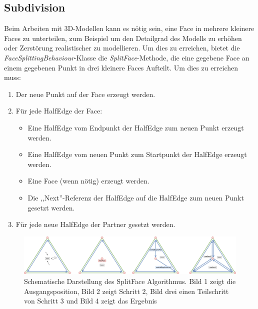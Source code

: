 \subsection{Subdivision}
Beim Arbeiten mit 3D-Modellen kann es n\"otig sein, eine Face in mehrere kleinere Faces zu unterteilen, zum Beispiel um den Detailgrad des Modells zu erh\"ohen oder Zerst\"orung realistischer zu modellieren. Um dies zu erreichen, bietet die \textit{FaceSplittingBehaviour}-Klasse die \textit{SplitFace}-Methode, die eine gegebene Face an einem gegebenen Punkt in drei kleinere Faces Aufteilt. Um dies zu erreichen muss:
\begin{enumerate}
	\item Der neue Punkt auf der Face erzeugt werden.
	\item F\"ur jede HalfEdge der Face:
	\begin{itemize}
		\item Eine HalfEdge vom Endpunkt der HalfEdge zum neuen Punkt erzeugt werden.
		\item Eine HalfEdge vom neuen Punkt zum Startpunkt der HalfEdge erzeugt werden.
		\item Eine Face (wenn n\"otig) erzeugt werden.
		\item Die ,,Next''-Referenz der HalfEdge auf die HalfEdge zum neuen Punkt gesetzt werden.
	\end{itemize}
	\item F\"ur jede neue HalfEdge der Partner gesetzt werden.
\end{enumerate}
\begin{figure}[H]
	\centering
	\includegraphics[width=1\linewidth]{Images/splitFace}
	\caption{Schematische Darstellung des SplitFace Algorithmus. Bild 1 zeigt die Ausgangsposition, Bild 2 zeigt Schritt 2, Bild drei einen Teilschritt von Schritt 3 und Bild 4 zeigt das Ergebnis}
	\label{fig:splitface}
\end{figure}

